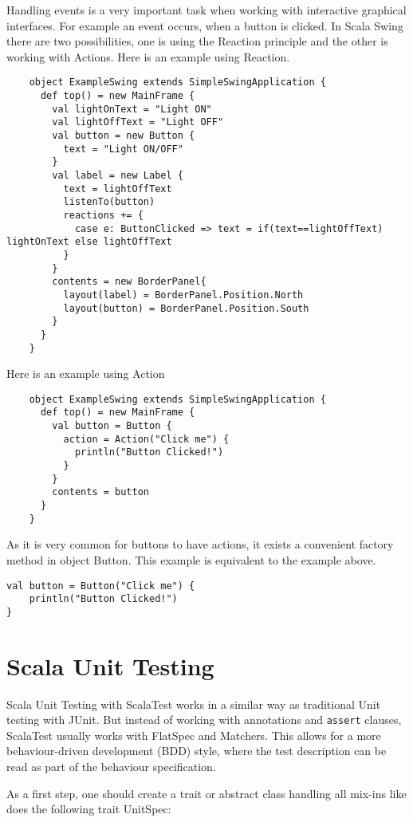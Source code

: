 \documentclass[
	a4paper,					10pt,							twoside,					openright,				notitlepage,			parskip=half,			]{scrreprt}
\begin{document}
Handling events is a very important task when working with interactive graphical interfaces. 
For example an event occurs, when a button is clicked. In Scala Swing there are two possibilities, 
one is using the Reaction principle and the other is working with Actions. Here is an example using Reaction.
\begin{lstlisting}
    object ExampleSwing extends SimpleSwingApplication {
      def top() = new MainFrame {
        val lightOnText = "Light ON"
        val lightOffText = "Light OFF"
        val button = new Button {
          text = "Light ON/OFF"
        }
        val label = new Label {
          text = lightOffText
          listenTo(button)
          reactions += {
            case e: ButtonClicked => text = if(text==lightOffText) lightOnText else lightOffText
          }
        }
        contents = new BorderPanel{
          layout(label) = BorderPanel.Position.North
          layout(button) = BorderPanel.Position.South
        }        
      }
    }
\end{lstlisting}
Here is an example using Action
 \begin{lstlisting}
    object ExampleSwing extends SimpleSwingApplication {
      def top() = new MainFrame {
        val button = Button {
          action = Action("Click me") {
          	println("Button Clicked!")
          }
        }
        contents = button
      }
    }
\end{lstlisting}
As it is very common for buttons to have actions, it exists a convenient factory method in object Button.
This example is equivalent to the example above.
\begin{lstlisting}
val button = Button("Click me") {
	println("Button Clicked!")
}
\end{lstlisting}

\section{Scala Unit Testing}
\label{sec:scala_scalatest}

Scala Unit Testing with ScalaTest works in a similar way as traditional Unit testing with JUnit. 
But instead of working with annotations and \verb|assert| clauses, ScalaTest usually works with 
FlatSpec and Matchers. This allows for a more behaviour-driven development (BDD) style, where the 
test description can be read as part of the behaviour specification.

As a first step, one should create a trait or abstract class handling all mix-ins like does the following
trait UnitSpec:
\end{document}
